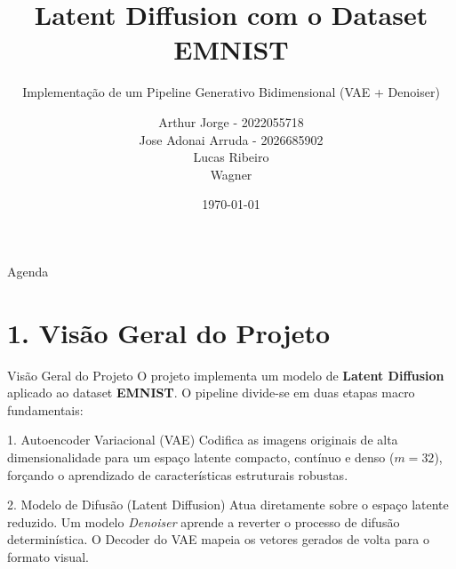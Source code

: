 \documentclass[10pt,aspectratio=169]{beamer}
\title[Latent Diffusion com EMNIST]{Latent Diffusion com o Dataset EMNIST}
\subtitle{Implementação de um Pipeline Generativo Bidimensional (VAE + Denoiser)}
\author{%
  Arthur Jorge - 2022055718 \\
  Jose Adonai Arruda - 2026685902 \\
  Lucas Ribeiro \\
  Wagner
}
\institute{Ambiente de Desenvolvimento: PyTorch \& Google Colab}
\date{\today}
\begin{document}
\begin{frame}
    \titlepage
\end{frame}

\begin{frame}{Agenda}
    \tableofcontents
\end{frame}

\section{1. Visão Geral do Projeto}
\begin{frame}{Visão Geral do Projeto}
    O projeto implementa um modelo de \textbf{Latent Diffusion} aplicado ao dataset \textbf{EMNIST}. O pipeline divide-se em duas etapas macro fundamentais:
    \vspace{0.3cm}
    \begin{block}{1. Autoencoder Variacional (VAE)}
        Codifica as imagens originais de alta dimensionalidade para um espaço latente compacto, contínuo e denso ($m=32$), forçando o aprendizado de características estruturais robustas.
    \end{block}
    \begin{block}{2. Modelo de Difusão (Latent Diffusion)}
        Atua diretamente sobre o espaço latente reduzido. Um modelo \textit{Denoiser} aprende a reverter o processo de difusão determinística. O Decoder do VAE mapeia os vetores gerados de volta para o formato visual.
    \end{block}
\end{frame}
\end{document}
